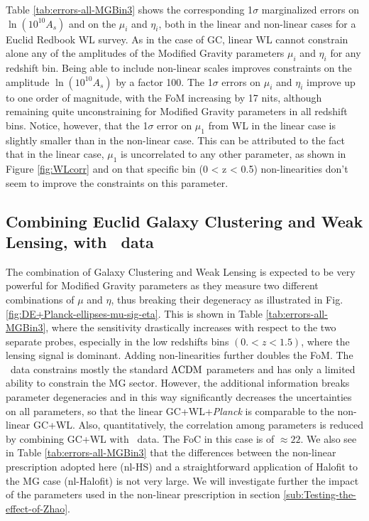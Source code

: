 Table \ref{tab:errors-all-MGBin3} shows the corresponding 1$\sigma$ marginalized errors on $\ln{(10^{10}A_s)}$
and on the $\mu_i$ and $\eta_i$, both in the linear and 
non-linear cases for a Euclid Redbook WL survey. 
As in the case of GC, linear WL cannot constrain alone any of the amplitudes of 
the Modified Gravity parameters $\mu_i$ and $\eta_i$ for any redshift bin. 
Being able to include non-linear scales improves constraints on the amplitude $\ln(10^{10}A_{s})$ by a factor 100. 
The 1$\sigma$ errors on $\mu_{i}$ and $\eta_{i}$ 
improve up to one order of magnitude, with the FoM increasing by 17 nits, although remaining quite unconstraining for Modified Gravity parameters in all redshift bins.
Notice, however, that the 1$\sigma$ error on $\mu_1$ from WL in the linear case is slightly smaller than in the non-linear case.
This can be attributed to the fact that in the linear case, $\mu_1$ is uncorrelated to any other parameter, as 
shown in Figure \ref{fig:WLcorr} and on that specific bin (0 < z < 0.5) non-linearities don't seem to improve the constraints on this parameter.




\subsection{Combining Euclid Galaxy Clustering and Weak Lensing, with \planck\ data \label{sub:Combined-GC-WL-Planck-Binned}}


The combination of Galaxy Clustering and Weak Lensing is expected to be very powerful for 
Modified Gravity parameters as they measure two different combinations of $\mu$ and $\eta$, 
thus breaking their degeneracy as illustrated in Fig. \ref{fig:DE+Planck-ellipses-mu-sig-eta}. 
This is shown in Table \ref{tab:errors-all-MGBin3}, where the sensitivity drastically increases with respect to the two separate probes, 
especially in the low redshifts bins $(0.<z<1.5)$, where the lensing signal is dominant. 
Adding non-linearities further doubles the FoM. The \planck\ 
data constrains mostly the standard $\Lambda\mathrm{CDM}$ parameters and has only a limited ability to constrain the MG sector. 
However, the additional information breaks parameter degeneracies and in this way significantly decreases
the uncertainties on all parameters, so that the linear GC+WL+{\it Planck} is comparable to the non-linear GC+WL. 
Also, quantitatively, the correlation among parameters is reduced by combining GC+WL with \planck\ data. The FoC in this case is of $\approx 22$.
We also see in Table \ref{tab:errors-all-MGBin3} that the differences between the non-linear prescription
adopted here (nl-HS) and a straightforward application of Halofit to the MG case (nl-Halofit) is not
very large. We will investigate further the impact of the parameters used in the non-linear prescription in section \ref{sub:Testing-the-effect-of-Zhao}.

